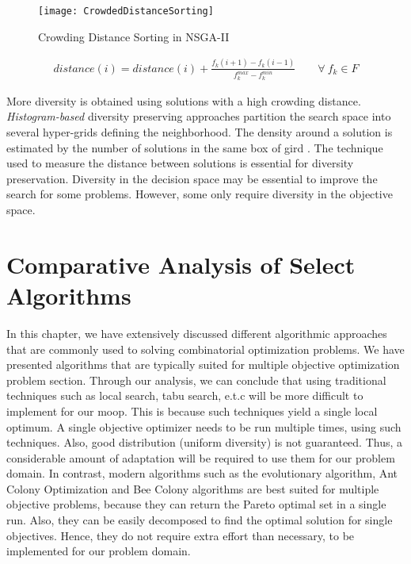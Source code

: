 \begin{figure}
    \centering
    \texttt{[image: CrowdedDistanceSorting]}
    \caption{Crowding Distance Sorting in NSGA-II}
    \label{fig:crowdeddistance_sorting}
\end{figure}

\begin{align}
    distance(i) = distance(i) + \frac{f_k(i+1) - f_k(i-1)}{f_k^{max} - f_k^{min}} \qquad \forall \ f_k \in F \label{eq:3.4a} 
\end{align}

More diversity is obtained using solutions with a high crowding distance. \textit{Histogram-based} diversity preserving approaches partition the search space into several hyper-grids defining the neighborhood. The density around a solution is estimated by the number of solutions in the same box of gird \parencite{Talbi2009Metaheuristics:Implementation}. The technique used to measure the distance between solutions is essential for diversity preservation. Diversity in the decision space may be essential to improve the search for some problems. However, some only require diversity in the objective space.

\section{Comparative Analysis of Select Algorithms}
In this chapter, we have extensively discussed different algorithmic approaches that are commonly used to solving combinatorial optimization problems. We have presented algorithms that are typically suited for multiple objective optimization problem section. Through our analysis, we can conclude that using traditional techniques such as local search, tabu search, e.t.c will be more difficult to implement for our \gls{moop}. This is because such techniques yield a single local optimum. A single objective optimizer needs to be run multiple times, using such techniques. Also, good distribution (uniform diversity) is not guaranteed. Thus, a considerable amount of adaptation will be required to use them for our problem domain. In contrast, modern algorithms such as the evolutionary algorithm, Ant Colony Optimization and Bee Colony algorithms are best suited for multiple objective problems, because they can return the Pareto optimal set in a single run. Also, they can be easily decomposed to find the optimal solution for single objectives. Hence, they do not require extra effort than necessary, to be implemented for our problem domain. 

